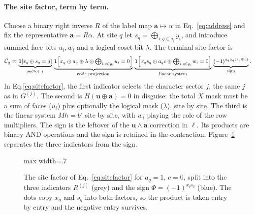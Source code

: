 \paragraph{The site factor, term by term.} Choose a binary right inverse $R$ of the label map $\boldsymbol a\mapsto\alpha$ in Eq.~\eqref{eq:address} and fix the representative $\boldsymbol a=R\alpha$. At site $q$ let $s_q=\bigoplus_{i:q\in g_i}y_i$, and introduce summed face bits $u_i,w_i$ and a logical-coset bit $\lambda$. The terminal site factor is
\begin{equation}\small
 {\cal C}_q=\underbrace{\mathbf1\!\left[v_q\oplus s_q=j\right]}_{\text{sector }j}\,
 \underbrace{\mathbf1\!\left[x_q\oplus a_q\oplus\lambda\oplus\textstyle\bigoplus_{i:q\in g_i}\!u_i=0\right]}_{\text{code projection}}\,
 \underbrace{\mathbf1\!\left[x_qs_q\oplus a_qc\oplus\textstyle\bigoplus_{i:q\in g_i}\!w_i=0\right]}_{\text{linear system}}\,
 \underbrace{(-1)^{a_qx_q(s_q\oplus c)}}_{\text{sign}} .
 \label{eq:sitefactor}
\end{equation}
In Eq.\eqref{eq:sitefactor}, the first indicator selects the character sector $j$, the same $j$ as in $G^{(j)}$. The second is $H(\boldsymbol u\oplus\boldsymbol a)=0$ in disguise: the total $X$ mask must be a sum of faces ($u_i$) plus optionally the logical mask ($\lambda$), site by site. The third is the linear system $Mh=b'$ site by site, with $w_i$ playing the role of the row multipliers. The sign is the leftover of the $\boldsymbol u\wedge\boldsymbol a$ correction in $\ell$. Its products are binary AND operations and the sign is retained in the contraction.
Figure~\ref{fig:terminalsplit} separates the three indicators from the sign.
{\color{black}
\begin{figure}[H]\centering
\begin{adjustbox}{max width=.7\linewidth}\end{adjustbox}
\caption{The site factor of Eq.~\eqref{eq:sitefactor} for $a_q=1$, $c=0$, split into the three indicators $R^{(j)}$ (grey) and the sign $\Phi=(-1)^{x_qs_q}$ (blue). The dots copy $x_q$ and $s_q$ into both factors, so the product is taken entry by entry and the negative entry survives.}
\label{fig:terminalsplit}
\end{figure}}
\begin{center}
\end{center}
